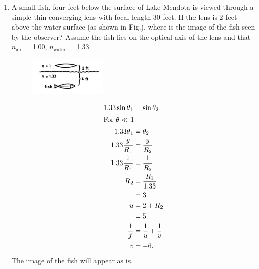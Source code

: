 \documentclass{zc-ust-hw}
\begin{document}
\begin{enumerate}
  \item A small fish, four feet below the surface of Lake Mendota is viewed
    through a simple thin converging lens with focal length 30 feet. H the lens
    is 2 feet above the water surface (as shown in Fig.), where is the image of
    the fish seen by the observer? Assume the fish lies on the optical axis of
    the lens and that $n_\text{air}$ = 1.00, \(n_\text{water}\) = 1.33. 
    \begin{figure}[H]
      \begin{center}
        \includegraphics[width=0.35\textwidth]{figures/1705961934.png}
      \end{center}
      \caption{}
    \end{figure}

    \begin{sol}
      \begin{align}
        1.33\sin \theta_{1} &= \sin \theta_{2} \\
        \intertext{For \(\theta \ll 1\)}
        1.33\theta_{1} &= \theta_{2} \\
        1.33 \frac{y}{R_{1}} &= \frac{y}{R_{2}} \\
        1.33 \frac{1}{R_{1}} &= \frac{1}{R_{2}} \\
        R_{2} &= \frac{R_{1}}{1.33} \\
              &= 3 \\
        u &= 2 + R_{2} \\
          &= 5 \\
        \frac{1}{f}&=\frac{1}{u}+\frac{1}{v} \\
        v&= -6
      .\end{align}
      The image of the fish will appear as is.
    \end{sol}

    \newpage


\end{enumerate}
\end{document}
